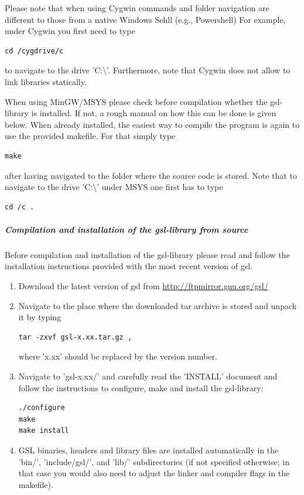 \documentclass[12pt,a4paper]{scrartcl}
\begin{document}
Please note that when using Cygwin commands and folder navigation are different to those from a native Windows Sehll (e.g., Powershell)
For example, under Cygwin you first need to type 
\begin{lstlisting}
cd /cygdrive/c
\end{lstlisting}
to navigate to the drive 'C:\textbackslash'. Furthermore, note that Cygwin does not allow to link libraries statically.

When using MinGW/MSYS please check before compilation whether the gsl-library is installed. If not, a rough manual on how this can be done is given below. When already installed, the easiest way to compile the program is again to use the provided makefile. For that simply type
\begin{lstlisting}
make
\end{lstlisting}
after having navigated to the folder where the source code is stored. Note that to navigate to the drive 'C:\textbackslash' under MSYS one first has to type \begin{lstlisting}
cd /c .
\end{lstlisting}

\subparagraph{Compilation and installation of the gsl-library from source}
Before compilation and installation of the gsl-library please read and follow the installation instructions provided with the most recent version of gsl.

\begin{enumerate}
\item Download the latest version of gsl from \url{http://ftpmirror.gnu.org/gsl/}
\item Navigate to the place where the downloaded tar archive is stored and unpack it by typing 
\begin{lstlisting}
tar -zxvf gsl-x.xx.tar.gz ,
\end{lstlisting}
where 'x.xx' should be replaced by the version number.
\item Navigate to 'gsl-x.xx/' and carefully read the 'INSTALL' document and follow the instructions to configure, make and install the gsl-library:
\begin{lstlisting}
./configure
make
make install
\end{lstlisting}
\item GSL binaries, headers and library files are installed automatically in the 'bin/', 'include/gsl/', and 'lib/' subdirectories (if not specified otherwise; in that case you would also need to adjust the linker and compiler flags in the makefile).
\end{enumerate}
\end{document}
